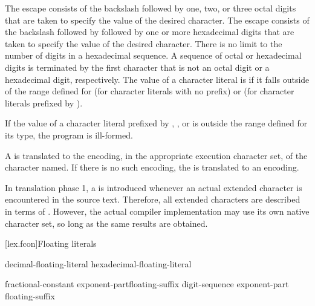 \pnum
The escape
%
 consists of the backslash followed by one,
two, or three octal digits that are taken to specify the value of the
desired character. The escape
%
consists of the backslash followed by  followed by one or more
hexadecimal digits that are taken to specify the value of the desired
character. There is no limit to the number of digits in a hexadecimal
sequence. A sequence of octal or hexadecimal digits is terminated by the
first character that is not an octal digit or a hexadecimal digit,
respectively.
%
The value of a character literal is  if it falls outside of the 
range defined for  (for character literals with no prefix) or
 (for character literals prefixed by ).
\begin{note}
If the value of a character literal prefixed by
, , or 
is outside the range defined for its type,
the program is ill-formed.
\end{note}

\pnum
A  is translated to the encoding, in the appropriate
execution character set, of the character named. If there is no such
encoding, the  is translated to an
 encoding.
\begin{note} In translation phase 1, a  is introduced whenever an
actual extended
character is encountered in the source text. Therefore, all extended
characters are described in terms of . However,
the actual compiler implementation may use its own native character set,
so long as the same results are obtained. \end{note}

[lex.fcon]{Floating literals}

%
\begin{bnf}
\br
    decimal-floating-literal\br
    hexadecimal-floating-literal
\end{bnf}

\begin{bnf}
\br
    fractional-constant exponent-part\opt floating-suffix\opt\br
    digit-sequence exponent-part floating-suffix\opt
\end{bnf}

